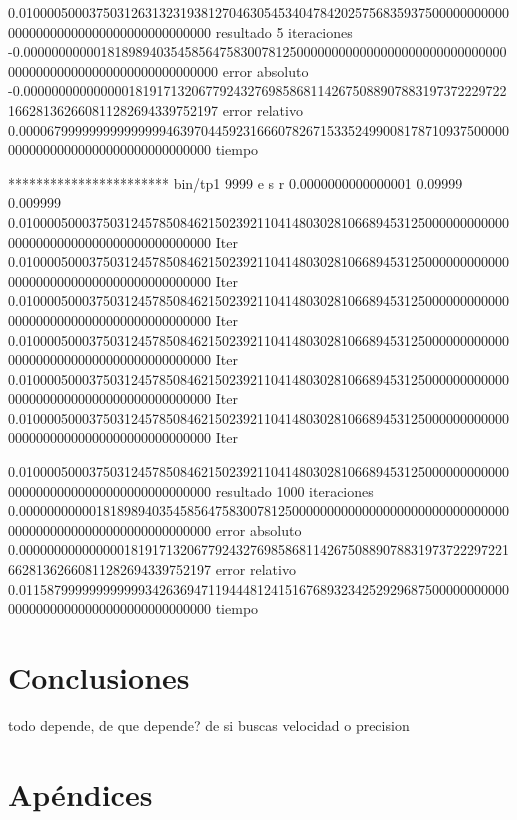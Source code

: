 \documentclass[10pt,a4paper]{article} \usepackage[utf8]{inputenc} %
\begin{document}
0.010000500037503126313231938127046305453404784202575683593750000000000000000000000000000000000000000 resultado
5 iteraciones
-0.000000000001818989403545856475830078125000000000000000000000000000000000000000000000000000000000000 error absoluto
-0.000000000000000181917132067792432769858681142675088907883197372229722166281362660811282694339752197 error relativo
0.000067999999999999999463970445923166607826715335249900817871093750000000000000000000000000000000000 tiempo

*********************** bin/tp1 9999 e s r 0.0000000000000001 0.09999 0.009999
0.010000500037503124578508462150239211041480302810668945312500000000000000000000000000000000000000000 Iter
0.010000500037503124578508462150239211041480302810668945312500000000000000000000000000000000000000000 Iter
0.010000500037503124578508462150239211041480302810668945312500000000000000000000000000000000000000000 Iter
0.010000500037503124578508462150239211041480302810668945312500000000000000000000000000000000000000000 Iter
0.010000500037503124578508462150239211041480302810668945312500000000000000000000000000000000000000000 Iter
0.010000500037503124578508462150239211041480302810668945312500000000000000000000000000000000000000000 Iter

0.010000500037503124578508462150239211041480302810668945312500000000000000000000000000000000000000000 resultado
1000 iteraciones
0.000000000001818989403545856475830078125000000000000000000000000000000000000000000000000000000000000 error absoluto
0.000000000000000181917132067792432769858681142675088907883197372229722166281362660811282694339752197 error relativo
0.011587999999999999342636947119444812415167689323425292968750000000000000000000000000000000000000000 tiempo


\section{Conclusiones}

todo depende, de que depende? de si buscas velocidad o precision



\section{Apéndices}
\end{document}
